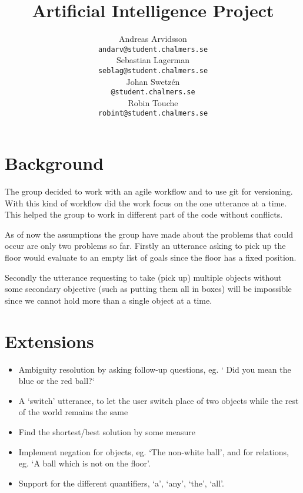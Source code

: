 \documentclass[11pt]{article}
\title{Artificial Intelligence Project}
\author{Andreas Arvidsson \\
  {\tt andarv@student.chalmers.se} \\
  Sebastian Lagerman \\
  {\tt seblag@student.chalmers.se} \\
  Johan Swetz\'{e}n \\
  {\tt @student.chalmers.se} \\
  Robin Touche \\
  {\tt robint@student.chalmers.se} \\}
\date{}
\begin{document}
\maketitle

\section*{Background}
The group decided to work with an agile workflow and to use git for versioning.
With this kind of workflow did the work focus on the one utterance at a time.
This helped the group to work in different part of the code without conflicts.

As of now the assumptions the group have made about the problems that could
occur are only two problems so far. Firstly an utterance asking to pick up the
floor would evaluate to an empty list of goals since the floor has a fixed
position.

Secondly the utterance requesting to take (pick up) multiple objects
without some secondary objective (such as putting them all in boxes) will be
impossible since we cannot hold more than a single object at a time.









\section*{Extensions}
\begin{itemize}
\item Ambiguity resolution by asking follow-up questions, eg. ` Did you mean the blue or the red ball?`
\item A `switch' utterance, to let the user switch place of two objects while the rest of the world remains the same
\item Find the shortest/best solution by some measure
\item Implement negation for objects, eg. `The non-white ball', and for relations, eg. `A ball which is not on the floor'.
\item Support for the different quantifiers, `a', `any', `the', `all'.
\end{itemize}
\newpage

\end{document}
